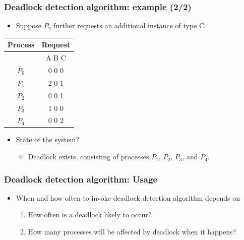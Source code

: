 \documentclass[CJKutf8,xcolor=pdftex,dvipsnames,table]{beamer}
\begin{document}
\begin{CJK*}{UTF8}{song}
  \begin{frame}
  \frametitle{Deadlock detection algorithm: example (2/2)} \pause
  \begin{itemize}
  \item{Suppose $P_2$ further requests an additional instance of type C.} \pause
  \end{itemize}
  \begin{tabular}{cc}
    Process & Request\\
    \hline
            & A B C\\
    $P_0$   & 0 0 0\\
    $P_1$   & 2 0 1\\
    $P_2$   & 0 0 1\\
    $P_3$   & 1 0 0\\
    $P_4$   & 0 0 2\\
  \end{tabular} \pause
  \begin{itemize}
  \item{State of the system?} \pause
    \begin{itemize}
    \item{Deadlock exists, consisting of processes $P_1$,  $P_2$, $P_3$, and $P_4$.}
    \end{itemize}
  \end{itemize}
  \end{frame}

  \begin{frame}
  \frametitle{Deadlock detection algorithm: Usage} \pause
  \begin{itemize}
  \item{When and how often to invoke deadlock detection algorithm depends on} \pause
    \begin{enumerate}
    \item{How often is a deadlock likely to occur?} \pause
    \item{How many processes will be affected by deadlock when it happens?}
    \end{enumerate}
  \end{itemize}
  \end{frame}


\end{CJK*}
\end{document}
